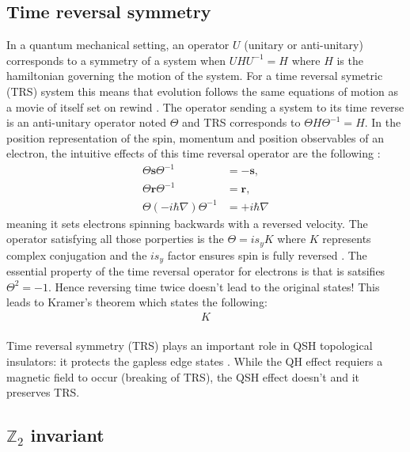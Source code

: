 \subsection{Time reversal symmetry}
In a quantum mechanical setting, an operator $U$ (unitary or anti-unitary) corresponds to a symmetry of a system when $U H U^{-1} = H$ where $H$ is the hamiltonian governing the motion of the system. For a time reversal symetric (TRS) system this means that evolution follows the same equations of motion as a movie of itself set on rewind \cite{shankar_topological_2018}. The operator sending a system to its time reverse is an anti-unitary operator noted $\Theta$ and TRS corresponds to $\Theta H \Theta^{-1} = H$. In the position representation of the spin, momentum and position observables of an electron, the intuitive effects of this time reversal operator are the following \cite{shankar_topological_2018} : 
\begin{align*}
    \Theta \mathbf{s} \Theta^{-1} &=-\mathbf{s}, \\
    \Theta \mathbf{r} \Theta^{-1} &=\mathbf{r}, \\
    \Theta (-i\hbar\nabla) \Theta^{-1} &=+i\hbar\nabla
\end{align*}
meaning it sets electrons spinning backwards with a reversed velocity. The operator satisfying all those porperties is the $\Theta = i s_y K$ where $K$ represents complex conjugation and the $i s_y$ factor ensures spin is fully reversed \cite{bernevig_topological_2013}. The essential property of the time reversal operator for electrons is that is satsifies $\Theta^2 = -1$. Hence reversing time twice doesn't lead to the original states\cite{hasan_topological_2010}! This leads to Kramer's theorem which states the following:
\begin{align*}
    K
\end{align*} \\

Time reversal symmetry (TRS) plays an important role in QSH topological insulators: it protects the gapless edge states \cite{kane_topological_2013}. While the QH effect requiers a magnetic field to occur (breaking of TRS), the QSH effect doesn't and it preserves TRS\cite{cayssol_topological_2021}. 



\subsection{$\mathbb{Z}_2$ invariant}